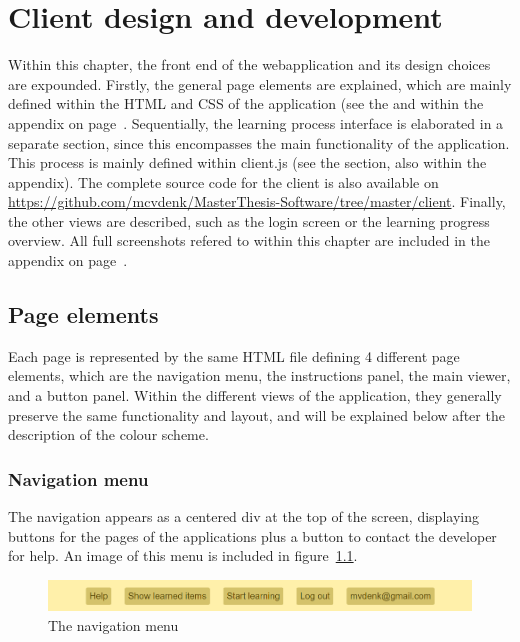 \chapter{Client design and development}
\label{ch:client}

Within this chapter, the front end of the webapplication and its design choices are expounded. Firstly, the general page elements are explained, which are mainly defined within the HTML and CSS of the application (see the  and  within the  appendix on page~\pageref{app:clientsource}. Sequentially, the learning process interface is elaborated in a separate section, since this encompasses the main functionality of the application. This process is mainly defined within client.js (see the  section, also within the  appendix). The complete source code for the client is also available on \url{https://github.com/mcvdenk/MasterThesis-Software/tree/master/client}. Finally, the other views are described, such as the login screen or the learning progress overview. All full screenshots refered to within this chapter are included in the  appendix on page~\pageref{app:screenshot}.

\section{Page elements}

Each page is represented by the same HTML file defining 4 different page elements, which are the navigation menu, the instructions panel, the main viewer, and a button panel. Within the different views of the application, they generally preserve the same functionality and layout, and will be explained below after the description of the colour scheme.

\subsection{Navigation menu}

The navigation appears as a centered div at the top of the screen, displaying buttons for the pages of the applications plus a button to contact the developer for help. An image of this menu is included in figure~\ref{fig:navmenu}.

\begin{figure}
    \centering
    \includegraphics[width=.8\textwidth]{img/navmenu.png}
    \caption{The navigation menu}
    \label{fig:navmenu}
\end{figure}

